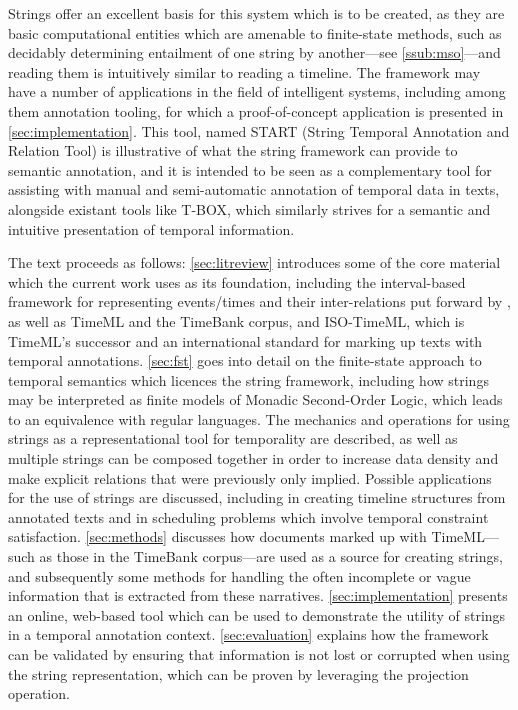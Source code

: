 \documentclass[a4paper,12pt,leqno]{article}
\begin{document}
Strings offer an excellent basis for this system which is to be created, as they are basic computational entities which are amenable to finite-state methods, such as decidably determining entailment of one string by another---see \cref{ssub:mso}---and reading them is intuitively similar to reading a timeline. The framework may have a number of applications in the field of intelligent systems, including among them annotation tooling, for which a proof-of-concept application is presented in \cref{sec:implementation}. This tool, named START (String Temporal Annotation and Relation Tool) is illustrative of what the string framework can provide to semantic annotation, and it is intended to be seen as a complementary tool for assisting with manual and semi-automatic annotation of temporal data in texts, alongside existant tools like T-BOX, which similarly strives for a semantic and intuitive presentation of temporal information.

The text proceeds as follows: \cref{sec:litreview} introduces some of the core material which the current work uses as its foundation, including the interval-based framework for representing events/times and their inter-relations put forward by \citet{allen1983maintaining}, as well as TimeML and the TimeBank corpus, and ISO-TimeML, which is TimeML's successor and an international standard for marking up texts with temporal annotations. \cref{sec:fst} goes into detail on the finite-state approach to temporal semantics which licences the string framework, including how strings may be interpreted as finite models of Monadic Second-Order Logic, which leads to an equivalence with regular languages. The mechanics and operations for using strings as a representational tool for temporality are described, as well as multiple strings can be composed together in order to increase data density and make explicit relations that were previously only implied. Possible applications for the use of strings are discussed, including in creating timeline structures from annotated texts and in scheduling problems which involve temporal constraint satisfaction. \cref{sec:methods} discusses how documents marked up with TimeML---such as those in the TimeBank corpus---are used as a source for creating strings, and subsequently some methods for handling the often incomplete or vague information that is extracted from these narratives. \cref{sec:implementation} presents an online, web-based tool which can be used to demonstrate the utility of strings in a temporal annotation context. \cref{sec:evaluation} explains how the framework can be validated by ensuring that information is not lost or corrupted when using the string representation, which can be proven by leveraging the projection operation.
\newpage
\end{document}
